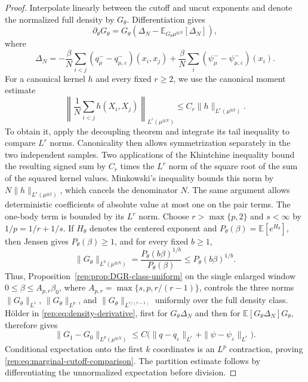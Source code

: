 \documentclass[11pt,reqno]{amsart}
\numberwithin{equation}{section}
\theoremstyle{plain}
\theoremstyle{definition}
\newcommand{\E}{\mathbb E}
\newcommand{\be}{\beta}
\newcommand{\vep}{\varepsilon}
\begin{document}
\begin{proof}
Interpolate linearly between the cutoff and uncut exponents and denote the normalized full density by $G_\theta$. Differentiation gives
\begin{equation}\label{rep:eq:density-derivative}
 \partial_\theta G_\theta
 =G_\theta\left(\Delta_N-\E_{G_\theta\mu^{\otimes N}}[\Delta_N]\right),
\end{equation}
where
\begin{equation}\label{rep:eq:DeltaN}
 \Delta_N=-\frac\be N\sum_{i<j}(q^-_\mu-q^-_{\mu,\vep})(x_i,x_j)
 +\frac\be N\sum_i(\psi^-_\mu-\psi^-_{\mu,\vep})(x_i).
\end{equation}
For a canonical kernel $h$ and every fixed $r\ge2$, we use the canonical moment estimate
\begin{equation}\label{rep:eq:canonical-moment}
 \left\|\frac1N\sum_{i<j}h(X_i,X_j)\right\|_{L^r(\mu^{\otimes N})}
 \le C_r\|h\|_{L^r(\mu^{\otimes2})}.
\end{equation}
To obtain it, apply the decoupling theorem \cite[Theorem~1]{delaPenaMontgomerySmith1995} and integrate its tail inequality to compare $L^r$ norms. Canonicality then allows symmetrization separately in the two independent samples. Two applications of the Khintchine inequality bound the resulting signed sum by $C_r$ times the $L^r$ norm of the square root of the sum of the squared kernel values. Minkowski's inequality bounds this norm by $N\|h\|_{L^r(\mu^{\otimes2})}$, which cancels the denominator $N$. The same argument allows deterministic coefficients of absolute value at most one on the pair terms.
The one-body term is bounded by its $L^r$ norm.  Choose $r>\max\{p,2\}$ and $s<\infty$ by $1/p=1/r+1/s$.  If $H_\theta$ denotes the centered exponent and $P_\theta(\be)=\E[e^{H_\theta}]$, then Jensen gives $P_\theta(\be)\ge1$, and for every fixed $b\ge1$,
\begin{equation}\label{rep:eq:normalized-density-amplification}
 \|G_\theta\|_{L^b(\mu^{\otimes N})}
 =\frac{P_\theta(b\be)^{1/b}}{P_\theta(\be)}
 \le P_\theta(b\be)^{1/b}.
\end{equation}
Thus, Proposition~\ref{rep:prop:DGR-class-uniform} on the single enlarged window
$0\le\be\le A_{p,r}\be_0$, where
$A_{p,r}=\max\{s,p,r/(r-1)\}$, controls the three norms
$\|G_\theta\|_{L^s}$, $\|G_\theta\|_{L^p}$, and
$\|G_\theta\|_{L^{r/(r-1)}}$ uniformly over the full density class.  H\"older in \eqref{rep:eq:density-derivative}, first for $G_\theta\Delta_N$ and then for
$\E[G_\theta\Delta_N]G_\theta$, therefore gives
\begin{equation}\label{rep:eq:full-density-comparison}
 \|G_1-G_0\|_{L^p(\mu^{\otimes N})}
 \le C\big(\|q-q_\vep\|_{L^r}+\|\psi-\psi_\vep\|_{L^r}\big).
\end{equation}
Conditional expectation onto the first $k$ coordinates is an $L^p$ contraction, proving \eqref{rep:eq:marginal-cutoff-comparison}. The partition estimate follows by differentiating the unnormalized expectation before division.
\end{proof}
\end{document}
